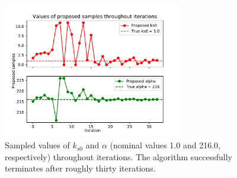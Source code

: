 \documentclass[bsc,frontabs,singlespacing,parskip,deptreport]{infthesis}
\begin{document}
\begin{figure}[h]
    \centering
    \includegraphics[width=0.7\textwidth]{Images/Multiple variables/Sample values_2var.pdf}
    \caption{Sampled values of $k_{s0}$ and $\alpha$ (nominal values 1.0 and 216.0, respectively) throughout iterations. The algorithm successfully terminates after roughly thirty iterations.}
    \label{fig:2var_sampled_values}
\end{figure}
\end{document}
